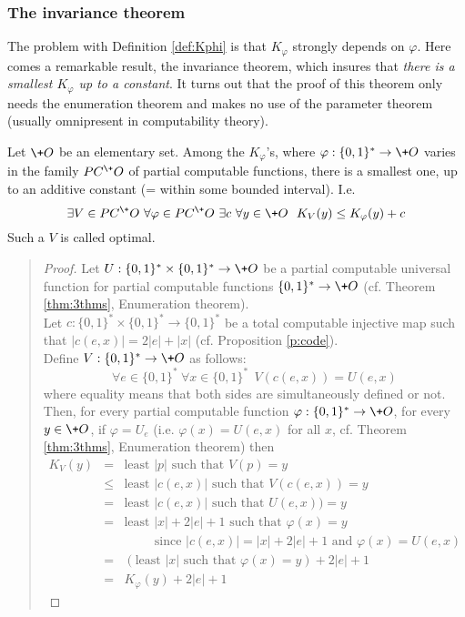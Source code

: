 \subsubsection{The invariance theorem}
The problem with Definition \ref{def:Kphi} is that $K_\varphi$
strongly depends on $\varphi$.
Here comes a remarkable result, the invariance theorem,
which insures that {\em there is a smallest $K_\varphi$
up to a constant}.
It turns out that the proof of this theorem only needs
the enumeration theorem and makes no use of the parameter
theorem (usually omnipresent in computability theory).
\begin{theorem}
\label{thm:invariance}
Let $\+O$ be an elementary set.
Among the $K_\varphi$'s, where $\varphi:{\{0,1\}^*}\to\+O$
varies in the family $PC^\+O$ of partial computable functions,
there is a smallest one, up to an additive constant
(= within some bounded interval). I.e.
$$
\exists V\in PC^\+O\ \forall \varphi\in PC^\+O\ \exists c\
\forall y\in\+O\ \ K_V(y) \leq K_\varphi(y) + c
$$
Such a $V$ is called optimal.
\end{theorem}
{\small\begin{quote}
\begin{proof}
Let $U:{\{0,1\}^*}\times {\{0,1\}^*}\to\+O$ be a partial computable
universal function for partial computable
functions ${\{0,1\}^*}\to\+O$
(cf. Theorem \ref{thm:3thms}, Enumeration theorem).
\\
Let $c: {\{0,1\}^*}\times{\{0,1\}^*}\to {\{0,1\}^*} $ be a total
computable injective map such that $|c(e,x)|=2|e|+|x|$
(cf. Proposition \ref{p:code}).
\\
Define $V: {\{0,1\}^*}\to\+O$ as follows:
$$
\forall e\in{\{0,1\}^*}\ \forall x\in {\{0,1\}^*}\ \
V(c(e,x)) = U(e,x)
$$
where equality means that both sides are simultaneously
defined or not.
Then, for every partial computable function
$\varphi: {\{0,1\}^*}\to\+O$, for every $y\in\+O$,
if $\varphi=U_e$
(i.e. $\varphi(x)=U(e,x)$ for all $x$,
cf. Theorem \ref{thm:3thms}, Enumeration theorem)
then
\begin{eqnarray*}
K_V(y) &=& \mbox{least $|p|$ such that $V(p)=y$}
\\
&\leq& \mbox{least $|c(e,x)|$ such that $V(c(e,x))=y$}
\\
&=& \mbox{least $|c(e,x)|$ such that $U(e,x))=y$}
\\
&=& \mbox{least $|x|+2|e|+1$ such that $\varphi(x)=y$}
\\&&\hspace{1cm}
\mbox{since $|c(e,x)|=|x|+2|e|+1$ and $\varphi(x)=U(e,x)$}
\\
& =& (\mbox{least $|x|$ such that $\varphi(x)=y$})+2|e|+1
\\
&=& K_\varphi(y)+2|e|+1
\end{eqnarray*}
\end{proof}
\end{quote}}
